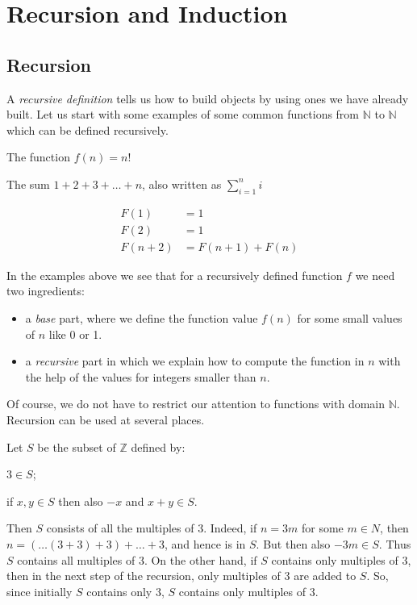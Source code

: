 \section{Recursion and Induction}

\subsection{Recursion}
A \emph{recursive definition} tells us how to build objects by using ones we have
already built. Let us start with some examples of some common functions from
$ \mathbb{N} $ to $ \mathbb{N} $ which can be defined recursively.

\begin{example}[Factorial]
    The function $ f(n) = n! $
\end{example}

\begin{example}[Sum]
    The sum $ 1 + 2 + 3 + \dots + n $, also written as $ \displaystyle\sum_{i=1}^{n}i $
\end{example}

\begin{example}
    \begin{align}
    F(1) &= 1 \\
    F(2) &= 1 \\
    F(n+2) &= F(n+1) + F(n)
    \end{align}
\end{example}

In the examples above we see that for a recursively defined function $f$ we need
two ingredients:
\begin{itemize}
    \item a \emph{base} part, where we define the function value $f(n)$ for some
    small values of $n$ like 0 or 1.
    \item a \emph{recursive} part in which we explain how to compute the function
    in $n$ with the help of the values for integers smaller than $n$.
\end{itemize}

Of course, we do not have to restrict our attention to functions with domain
$\mathbb{N}$. Recursion can be used at several places.

\begin{example}
Let $S$ be the subset of $\mathbb{Z}$ defined by:

$3 \in S$;

if $x,y \in S$ then also $-x$ and $x+y \in S$.

Then $S$ consists of all the multiples of 3. Indeed, if $n = 3m$ for some
$m \in N$, then $n = (\dots(3 + 3) + 3) + \dots + 3$, and hence is in $S$. But
then also $-3m \in S$. Thus $S$ contains all multiples of 3. On the other hand,
if $S$ contains only multiples of 3, then in the next step of the recursion,
only multiples of 3 are added to $S$. So, since initially $S$ contains only 3,
$S$ contains only multiples of 3.
\end{example}

